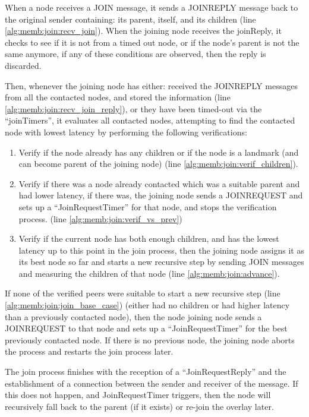 When a node receives a JOIN message, it sends a JOINREPLY message back to the original sender containing: its parent, itself, and its children (line \ref{alg:memb:join:recv_join}). When the joining node receives the joinReply, it checks to see if it is not from a timed out node, or if the node's parent is not the same anymore, if any of these conditions are observed, then the reply is discarded. 

Then, whenever the joining node has either: received the JOINREPLY messages from all the contacted nodes, and stored the information (line \ref{alg:memb:join:recv_join_reply}), or they have been timed-out via the ``joinTimers'', it evaluates all contacted nodes, attempting to find the contacted node with lowest latency by performing the following verifications:

\begin{enumerate}
    \item Verify if the node already has any children or if the node is a landmark (and can become parent of the joining node) (line \ref{alg:memb:join:verif_children}).
    
    \item Verify if there was a node already contacted which was a suitable parent and had lower latency, if there was, the joining node sends a JOINREQUEST and sets up a ``JoinRequestTimer'' for that node, and stops the verification process. (line \ref{alg:memb:join:verif_vs_prev})

    \item Verify if the current node has both enough children, and has the lowest latency up to this point in the join process, then the joining node assigns it as its best node so far and starts a new recursive step by sending JOIN messages and measuring the children of that node (line \ref{alg:memb:join:advance}).
\end{enumerate}

If none of the verified peers were suitable to start a new recursive step (line \ref{alg:memb:join:join_base_case}) (either had no children or had higher latency than a previously contacted node), then the node joining node sends a JOINREQUEST to that node and sets up a ``JoinRequestTimer'' for the best previously contacted node. If there is no previous node, the joining node aborts the process and restarts the join process later.

The join process finishes with the reception of a ``JoinRequestReply'' and the establishment of a connection between the sender and receiver of the message. If this does not happen, and JoinRequestTimer triggers, then the node will recursively fall back to the parent (if it exists) or re-join the overlay later.


